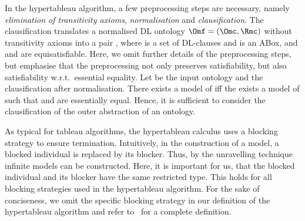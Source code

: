 In the hypertableau algorithm, a few preprocessing steps are necessary, namely \emph{elimination of
  transitivity axioms}, \emph{normalisation} and \emph{clausification}. The clausification
translates a normalised DL ontology $\Omf = (\Omc, \Rmc)$ without transitivity axioms into a pair
\CA, where \Cmc is a set of DL-clauses and \A is an ABox, and \Omf and \CA are equisatisfiable.
Here, we omit further details of the preprocessing steps, but emphasise that the preprocessing not
only preserves satisfiability, but also satisfiability w.r.t.~essential equality.  Let \Kmc be the
input ontology and \CA the clausification after normalisation. There exists a model \I of \Kmc iff
the exists a model \Hmc of \CA such that \I and \Hmc are essentially equal. Hence, it is sufficient
to consider the clausification of the outer abstraction of an \LMLO ontology.

As typical for tableau algorithms, the hypertableau calculus uses a blocking strategy to ensure
termination. Intuitively, in the construction of a model, a blocked individual is replaced by its
blocker. Thus, by the unravelling technique infinite models can be constructed. Here, it is important for us, that
the blocked individual and its blocker have the same restricted type. This holds for all blocking
strategies used in the hypertableau algorithm. For the sake of conciseness, we omit the specific
blocking strategy in our definition of the hypertableau algorithm and refer to~\cite{MoSH-JAIR09}
for a complete definition.

